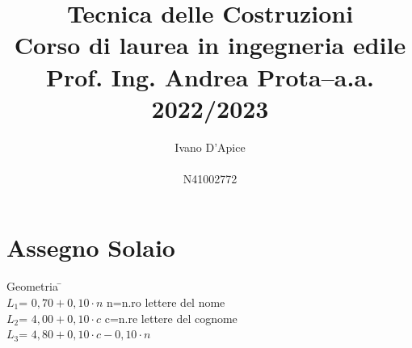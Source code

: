 \documentclass[a4paper,12pt, oneside]{book}
\title{\textbf{Tecnica delle Costruzioni}\\ \textbf{Corso di laurea in ingegneria edile}\\ \textbf{Prof. Ing. Andrea Prota–a.a. 2022/2023}}
\author{Ivano D'Apice\\\\ N41002772}
\date{}
\begin{document}
	\maketitle
	
	
	\newtheorem{teorema}{Teorema}
	\newtheorem{definizione}{Definizione}
	\newtheorem{esempio}{Esempio}
	\newtheorem{corollario}{Corollario}
	\newtheorem{lemma}{Lemma}
	\newtheorem{osservazione}{Osservazione}
	\newtheorem{nota}{Nota}
	\newtheorem{esercizio}{Esercizio}
	\tableofcontents
	\renewcommand{\chaptermark}[1]{%
		\markboth{\chaptername
			\ \thechapter.\ #1}{}}
	\renewcommand{\sectionmark}[1]{\markright{\thesection.\ #1}}
	
	\chapter{Assegno Solaio}
	    
    \begin{tabbing}
	 Geometria \hspace{10em} \= \hspace{1em} \\
	 $L_1$=  $0,70+0,10\cdot n$              \> n=n.ro lettere del nome    \\
	 $L_2$=  $4,00+0,10\cdot c$              \> c=n.re lettere del cognome \\ 
	 $L_3$=  $4,80+0,10\cdot c-0,10\cdot n$  \>                             
    \end{tabbing}	    

	\begin{figure}[H]
		\centering
		\hspace*{-.5cm}
		\caption{}
		\label{fig:travesolaio}
	\end{figure}
	
\end{document}
